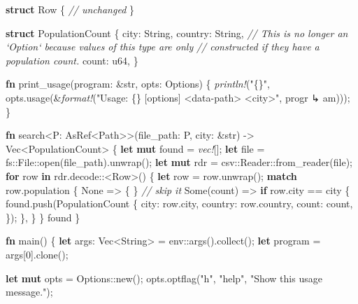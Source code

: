 \documentclass[a4paper,]{book}
\newenvironment{Shaded}{\begin{snugshade}}{\end{snugshade}}
\newcommand{\KeywordTok}[1]{\textcolor[rgb]{0.13,0.29,0.53}{\textbf{{#1}}}}
\newcommand{\DataTypeTok}[1]{\textcolor[rgb]{0.13,0.29,0.53}{{#1}}}
\newcommand{\DecValTok}[1]{\textcolor[rgb]{0.00,0.00,0.81}{{#1}}}
\newcommand{\ConstantTok}[1]{\textcolor[rgb]{0.00,0.00,0.00}{{#1}}}
\newcommand{\StringTok}[1]{\textcolor[rgb]{0.31,0.60,0.02}{{#1}}}
\newcommand{\CommentTok}[1]{\textcolor[rgb]{0.56,0.35,0.01}{\textit{{#1}}}}
\newcommand{\PreprocessorTok}[1]{\textcolor[rgb]{0.56,0.35,0.01}{\textit{{#1}}}}
\newcommand{\NormalTok}[1]{{#1}}
\begin{document}
\begin{Shaded}
\begin{Highlighting}[]
\KeywordTok{struct} \NormalTok{Row \{}
    \CommentTok{// unchanged}
\NormalTok{\}}

\KeywordTok{struct} \NormalTok{PopulationCount \{}
    \NormalTok{city: }\DataTypeTok{String}\NormalTok{,}
    \NormalTok{country: }\DataTypeTok{String}\NormalTok{,}
    \CommentTok{// This is no longer an `Option` because values of this type are only}
    \CommentTok{// constructed if they have a population count.}
    \NormalTok{count: }\DataTypeTok{u64}\NormalTok{,}
\NormalTok{\}}

\KeywordTok{fn} \NormalTok{print_usage(program: &}\DataTypeTok{str}\NormalTok{, opts: Options) \{}
    \PreprocessorTok{println!}\NormalTok{(}\StringTok{"\{\}"}\NormalTok{, opts.usage(&}\PreprocessorTok{format!}\NormalTok{(}\StringTok{"Usage: \{\} [options] <data-path> <city>"}\NormalTok{, progr}
\NormalTok{↳ am)));}
\NormalTok{\}}

\KeywordTok{fn} \NormalTok{search<P: AsRef<Path>>(file_path: P, city: &}\DataTypeTok{str}\NormalTok{) -> }\DataTypeTok{Vec}\NormalTok{<PopulationCount> \{}
    \KeywordTok{let} \KeywordTok{mut} \NormalTok{found = }\PreprocessorTok{vec!}\NormalTok{[];}
    \KeywordTok{let} \NormalTok{file = fs::File::open(file_path).unwrap();}
    \KeywordTok{let} \KeywordTok{mut} \NormalTok{rdr = csv::Reader::from_reader(file);}
    \KeywordTok{for} \NormalTok{row }\KeywordTok{in} \NormalTok{rdr.decode::<Row>() \{}
        \KeywordTok{let} \NormalTok{row = row.unwrap();}
        \KeywordTok{match} \NormalTok{row.population \{}
            \ConstantTok{None} \NormalTok{=> \{ \} }\CommentTok{// skip it}
            \ConstantTok{Some}\NormalTok{(count) => }\KeywordTok{if} \NormalTok{row.city == city \{}
                \NormalTok{found.push(PopulationCount \{}
                    \NormalTok{city: row.city,}
                    \NormalTok{country: row.country,}
                    \NormalTok{count: count,}
                \NormalTok{\});}
            \NormalTok{\},}
        \NormalTok{\}}
    \NormalTok{\}}
    \NormalTok{found}
\NormalTok{\}}

\KeywordTok{fn} \NormalTok{main() \{}
    \KeywordTok{let} \NormalTok{args: }\DataTypeTok{Vec}\NormalTok{<}\DataTypeTok{String}\NormalTok{> = env::args().collect();}
    \KeywordTok{let} \NormalTok{program = args[}\DecValTok{0}\NormalTok{].clone();}

    \KeywordTok{let} \KeywordTok{mut} \NormalTok{opts = Options::new();}
    \NormalTok{opts.optflag(}\StringTok{"h"}\NormalTok{, }\StringTok{"help"}\NormalTok{, }\StringTok{"Show this usage message."}\NormalTok{);}


\end{Highlighting}
\end{Shaded}
\end{document}
